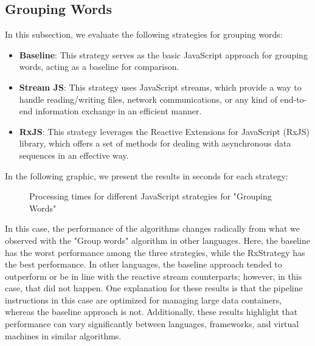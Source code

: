 \subsection{Grouping Words}
\label{subsec:grouping_words_js}

In this subsection, we evaluate the following strategies for grouping words:

\begin{itemize}
    \item \textbf{Baseline}: This strategy serves as the basic JavaScript approach for grouping words, acting as a baseline for comparison.
    \item \textbf{Stream JS}: This strategy uses JavaScript streams, which provide a way to handle reading/writing files, network communications, or any kind of end-to-end information exchange in an efficient manner.
    \item \textbf{RxJS}: This strategy leverages the Reactive Extensions for JavaScript (RxJS) library, which offers a set of methods for dealing with asynchronous data sequences in an effective way.
\end{itemize}

In the following graphic, we present the results in seconds for each strategy: 

\begin{figure}[H]
    \centering
    \caption{Processing times for different JavaScript strategies for "Grouping Words"}
    \label{fig:grouping_words_processing_times_js}
\end{figure}

In this case, the performance of the algorithms changes radically from what we observed with the "Group words" algorithm in other languages. Here, the baseline has the worst performance among the three strategies, while the RxStrategy has the best performance.
In other languages, the baseline approach tended to outperform or be in line with the reactive stream counterparts; however, in this case, that did not happen.
One explanation for these results is that the pipeline instructions in this case are optimized for managing large data containers, whereas the baseline approach is not. Additionally, these results highlight that performance can vary significantly between languages, frameworks, and virtual machines in similar algorithms.
